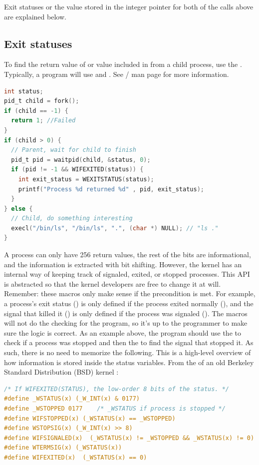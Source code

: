 Exit statuses or the value stored in the integer pointer for both of the calls above are explained below.

\subsection{Exit statuses}

To find the return value of  or value included in  from a child process, use the . Typically, a program will use  and .
See / man page for more information.

\begin{lstlisting}[language=C]
int status;
pid_t child = fork();
if (child == -1) {
  return 1; //Failed
}
if (child > 0) {
  // Parent, wait for child to finish
  pid_t pid = waitpid(child, &status, 0);
  if (pid != -1 && WIFEXITED(status)) {
    int exit_status = WEXITSTATUS(status);
    printf("Process %d returned %d" , pid, exit_status);
  }
} else {
  // Child, do something interesting
  execl("/bin/ls", "/bin/ls", ".", (char *) NULL); // "ls ."
}
\end{lstlisting}

A process can only have 256 return values, the rest of the bits are informational, and the information is extracted with bit shifting.
However, the kernel has an internal way of keeping track of signaled, exited, or stopped processes.
This API is abstracted so that the kernel developers are free to change it at will.
Remember: these macros only make sense if the precondition is met.
For example, a process's exit status () is only defined if the process exited normally (), and the signal that killed it () is only defined if the process was signaled ().
The macros will not do the checking for the program, so it's up to the programmer to make sure the logic is correct.
As an example above, the program should use the  to check if a process was stopped and then the  to find the signal that stopped it.
As such, there is no need to memorize the following. This is a high-level overview of how information is stored inside the status variables. From the  of an old Berkeley Standard Distribution (BSD) kernel \cite{sys/wait.h}:

\begin{lstlisting}[language=C]
/* If WIFEXITED(STATUS), the low-order 8 bits of the status. */
#define _WSTATUS(x) (_W_INT(x) & 0177)
#define _WSTOPPED 0177    /* _WSTATUS if process is stopped */
#define WIFSTOPPED(x) (_WSTATUS(x) == _WSTOPPED)
#define WSTOPSIG(x) (_W_INT(x) >> 8)
#define WIFSIGNALED(x)  (_WSTATUS(x) != _WSTOPPED && _WSTATUS(x) != 0)
#define WTERMSIG(x) (_WSTATUS(x))
#define WIFEXITED(x)  (_WSTATUS(x) == 0)
\end{lstlisting}


